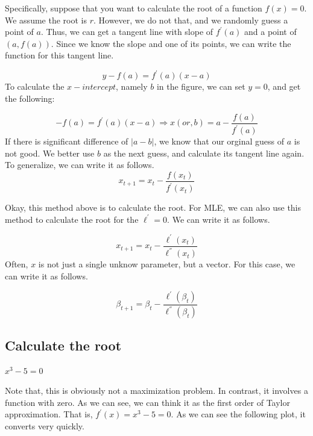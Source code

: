 \documentclass[]{book}
\begin{document}
Specifically, suppose that you want to calculate the root of a function \(f(x)=0\). We assume the root is \(r\). However, we do not that, and we randomly guess a point of \(a\). Thus, we can get a tangent line with slope of \(f^{'}(a)\) and a point of \((a,f(a))\). Since we know the slope and one of its points, we can write the function for this tangent line.

\[y-f(a)=f^{'}(a)(x-a)\]
To calculate the \(x-intercept\), namely \(b\) in the figure, we can set \(y=0\), and get the following:

\[-f(a)=f^{'}(a)(x-a) \Rightarrow x (or, b)= a-\frac{f(a)}{f^{'}(a)}\]
If there is significant difference of \(|a-b|\), we know that our orginal guess of \(a\) is not good. We better use \(b\) as the next guess, and calculate its tangent line again. To generalize, we can write it as follows.
\[x_{t+1}=x_{t}-\frac{f(x_t)}{f^{'}(x_t)}\]

Okay, this method above is to calculate the root. For MLE, we can also use this method to calculate the root for the \(\ell ^{'}=0\). We can write it as follows.

\[x_{t+1}=x_{t}-\frac{\ell^{'}(x_t)}{\ell^{''}(x_t)}\]
Often, \(x\) is not just a single unknow parameter, but a vector. For this case, we can write it as follows.

\[\beta_{t+1}=\beta_{t}-\frac{\ell^{'}(\beta_t)}{\ell^{''}(\beta_t)}\]

\hypertarget{calculate-the-root}{%
\subsection{Calculate the root}\label{calculate-the-root}}

\(x^3-5=0\)

Note that, this is obviously not a maximization problem. In contrast, it involves a function with zero. As we can see, we can think it as the first order of Taylor approximation. That is, \(f^{'}(x)=x^3-5=0\). As we can see the following plot, it converts very quickly.
\end{document}
